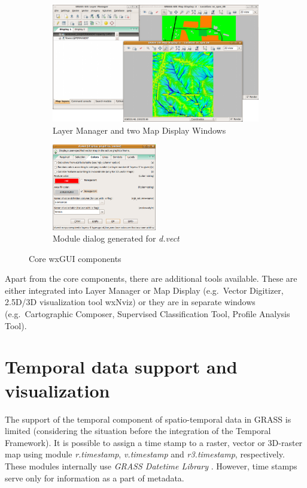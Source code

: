 \documentclass[a4paper,12pt,oneside]{book}
\newcommand{\module}[1]{\textsl{#1}}
\begin{document}
\begin{figure}[ht!]
\centering
    \begin{subfigure}[ht]{\textwidth}
    \centering
        \includegraphics[width=\textwidth]{./images/wxGUI_1.png}
    \caption{Layer Manager and two Map Display Windows}
    \label{fig:wxGUI1}
    \end{subfigure}

\vspace{10pt}

    \begin{subfigure}[ht]{\textwidth}
    \centering
        \includegraphics[width=0.5\textwidth]{./images/wxGUI_2.png}
    \caption{Module dialog generated for \module{d.vect}}
    \label{fig:wxGUI2}
    \end{subfigure}
\caption{Core wxGUI components}
\label{fig:wxGUI}
\end{figure}

Apart from the core components, there are additional tools available.
These are either integrated into Layer Manager or Map Display
(e.g.\ Vector Digitizer, 2.5D/3D visualization tool wxNviz) or they are in separate windows
(e.g.\ Cartographic Composer, Supervised Classification Tool, Profile Analysis Tool).

\section{Temporal data support and visualization}
\label{sec:grassstate}
The support of the temporal component of spatio-temporal data in GRASS is limited
(considering the situation before the integration of the Temporal Framework).
It is possible to assign a time stamp to a raster, vector or 3D-raster map using module
\module{r.timestamp}, \module{v.timestamp} and \module{r3.timestamp}, respectively.
These modules internally use \emph{GRASS Datetime Library} \cite{grassProgMan}.
However, time stamps serve only for information as a part of metadata.
\end{document}
